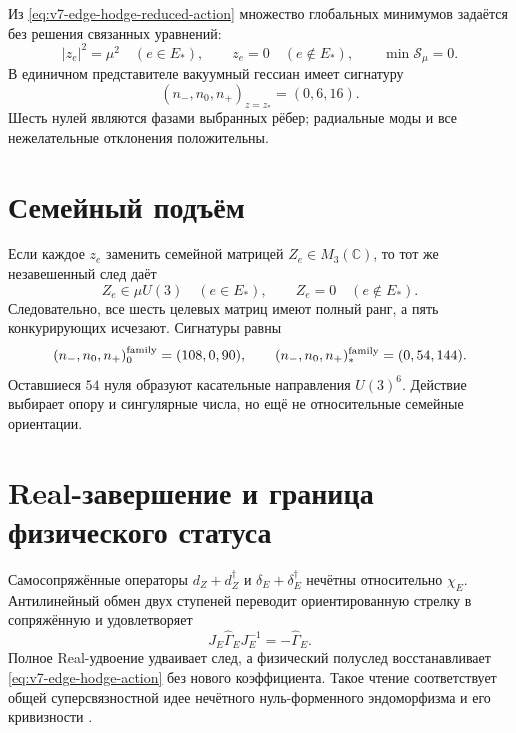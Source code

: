 Из \eqref{eq:v7-edge-hodge-reduced-action} множество глобальных минимумов
задаётся без решения связанных уравнений:
\begin{equation}
 |z_e|^2=\mu^2\quad(e\in E_*),
 \qquad
 z_e=0\quad(e\notin E_*),
 \qquad
 \min\mathcal S_\mu=0.
 \label{eq:v7-edge-hodge-vacuum}
\end{equation}
В единичном представителе вакуумный гессиан имеет сигнатуру
\begin{equation}
 (n_-,n_0,n_+)_{z=z_*}=(0,6,16).
 \label{eq:v7-edge-hodge-vacuum-hessian}
\end{equation}
Шесть нулей являются фазами выбранных рёбер; радиальные моды и все
нежелательные отклонения положительны.

\section{Семейный подъём}

Если каждое $z_e$ заменить семейной матрицей $Z_e\in M_3(\mathbb C)$, то
тот же незавешенный след даёт
\begin{equation}
 Z_e\in\mu U(3)\quad(e\in E_*),
 \qquad
 Z_e=0\quad(e\notin E_*).
 \label{eq:v7-edge-hodge-family-vacuum}
\end{equation}
Следовательно, все шесть целевых матриц имеют полный ранг, а пять
конкурирующих исчезают. Сигнатуры равны
\begin{equation}
 (n_-,n_0,n_+)_{0}^{\rm family}=(108,0,90),
 \qquad
 (n_-,n_0,n_+)_{*}^{\rm family}=(0,54,144).
 \label{eq:v7-edge-hodge-family-hessians}
\end{equation}
Оставшиеся $54$ нуля образуют касательные направления $U(3)^6$. Действие
выбирает опору и сингулярные числа, но ещё не относительные семейные
ориентации.

\section{Real-завершение и граница физического статуса}

Самосопряжённые операторы $d_Z+d_Z^\dagger$ и
$\delta_E+\delta_E^\dagger$ нечётны относительно $\chi_E$. Антилинейный
обмен двух ступеней переводит ориентированную стрелку в сопряжённую и
удовлетворяет
\begin{equation}
 J_E\widehat\Gamma_EJ_E^{-1}=-\widehat\Gamma_E.
 \label{eq:v7-edge-hodge-real-grading}
\end{equation}
Полное Real-удвоение удваивает след, а физический полуслед восстанавливает
\eqref{eq:v7-edge-hodge-action} без нового коэффициента. Такое чтение
соответствует общей суперсвязностной идее нечётного нуль-форменного
эндоморфизма и его кривизности \cite{v7-edge-hodge-quillen}.

